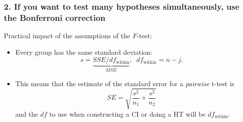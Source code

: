 \documentclass[slidestop,compress,mathserif,12pt,t,professionalfonts,xcolor=table]{beamer}
\newcommand{\bonferroni}{If you want to test many hypotheses simultaneously, use the Bonferroni correction}
\newcommand{\ftest}{You can use another version of the $F$-test to compare grouping by 2 variables vs. grouping by 1 variable}
\begin{document}

\begin{frame}
  \frametitle{2. \bonferroni}

Practical impact of the assumptions of the $F$-test:

\begin{itemize}

\item Every group has the same standard deviation:
\[
s = \underbrace{SSE / df_{\text{within}}}_{MSE}, \; \; df_{\text{within}} = n - j.
\]

\item This means that the estimate of the standard error for a \emph{pairwise} t-test is
\[
SE = \sqrt{\frac{s^2}{n_1} + \frac{s^2}{n_2}}
\]
and the $df$ to use when constructing a CI or doing a HT will be $df_{\text{within}}$.

\end{itemize}

\end{frame}


\begin{frame}
  \frametitle{}

\vfill


\vfill

\end{frame}






\end{document}
